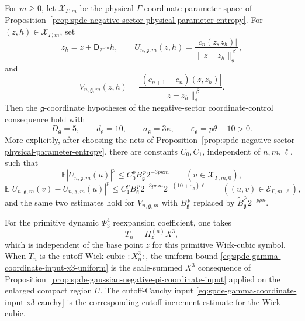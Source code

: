 \begin{proposition}
For \(m\geq0\), let \(\mathcal X_{\Gamma,m}\) be the physical
\(\Gamma\)-coordinate parameter space of
Proposition~\ref{prop:spde-negative-sector-physical-parameter-entropy}.  For
\((z,h)\in\mathcal X_{\Gamma,m}\), set
\[
  z_h=z+\mathsf D_{2^{-m}}h,
  \qquad
  U_{n,\mathfrak g,m}(z,h)
  =
  \frac{|c_n(z,z_h)|}
       {\|z-z_h\|_{\mathfrak s}^{\,\beta}},
\]
and
\begin{equation}
  V_{n,\mathfrak g,m}(z,h)
  =
  \frac{|(c_{n+1}-c_n)(z,z_h)|}
       {\|z-z_h\|_{\mathfrak s}^{\,\beta}} .
  \label{eq:spde-gamma-coordinate-input-fields}
\end{equation}
Then the \(\mathfrak g\)-coordinate hypotheses of
the negative-sector coordinate-control consequence hold
with
\begin{equation}
  D_{\mathfrak g}=5,
  \qquad
  d_{\mathfrak g}=10,
  \qquad
  \sigma_{\mathfrak g}=3\kappa,
  \qquad
  \varepsilon_{\mathfrak g}=p\theta-10>0 .
  \label{eq:spde-gamma-coordinate-input-slacks}
\end{equation}
More explicitly, after choosing the nets of
Proposition~\ref{prop:spde-negative-sector-physical-parameter-entropy}, there
are constants \(C_0,C_1\), independent of \(n,m,\ell\), such that
\begin{equation}
  \mathbb E|U_{n,\mathfrak g,m}(u)|^p
  \leq
  C_0^pB_{\mathfrak g}^{\,p}2^{-3p\kappa m}
  \qquad
  (u\in\mathcal X_{\Gamma,m,0}),
  \label{eq:spde-gamma-coordinate-input-base}
\end{equation}
\begin{equation}
  \mathbb E|U_{n,\mathfrak g,m}(v)-U_{n,\mathfrak g,m}(u)|^p
  \leq
  C_1^pB_{\mathfrak g}^{\,p}2^{-3p\kappa m}
  2^{-(10+\varepsilon_{\mathfrak g})\ell}
  \qquad
  ((u,v)\in\mathcal E_{\Gamma,m,\ell}),
  \label{eq:spde-gamma-coordinate-input-edge}
\end{equation}
and the same two estimates hold for \(V_{n,\mathfrak g,m}\) with
\(B_{\mathfrak g}^{\,p}\) replaced by
\(\widetilde B_{\mathfrak g}^{\,p}2^{-p\rho n}\).

For the primitive dynamic \(\Phi^4_3\) reexpansion coefficient, one takes
\[
  T_n=\Pi_z^{(n)}X^3 ,
\]
which is independent of the base point \(z\) for this primitive Wick-cubic
symbol.  When \(T_n\) is the cutoff Wick cubic \(:X_n^3:\), the uniform bound
\eqref{eq:spde-gamma-coordinate-input-x3-uniform} is the scale-summed
\(X^3\) consequence of
Proposition~\ref{prop:spde-gaussian-negative-pi-coordinate-input} applied on
the enlarged compact region \(U\).  The cutoff-Cauchy input
\eqref{eq:spde-gamma-coordinate-input-x3-cauchy} is the corresponding
cutoff-increment estimate for the Wick cubic.
\end{proposition}

